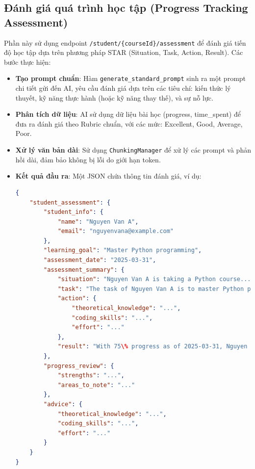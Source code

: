 \subsection{Đánh giá quá trình học tập (Progress Tracking Assessment)}
Phần này sử dụng endpoint \texttt{/student/\{courseId\}/assessment} để đánh giá tiến độ học tập dựa trên phương pháp STAR (Situation, Task, Action, Result). Các bước thực hiện:
\begin{itemize}
    \item \textbf{Tạo prompt chuẩn}: Hàm \texttt{generate\_standard\_prompt} sinh ra một prompt chi tiết gửi đến AI, yêu cầu đánh giá dựa trên các tiêu chí: kiến thức lý thuyết, kỹ năng thực hành (hoặc kỹ năng thay thế), và sự nỗ lực.
    \item \textbf{Phân tích dữ liệu}: AI sử dụng dữ liệu bài học (progress, time\_spent) để đưa ra đánh giá theo Rubric chuẩn, với các mức: Excellent, Good, Average, Poor.
    \item \textbf{Xử lý văn bản dài}: Sử dụng \texttt{ChunkingManager} để xử lý các prompt và phản hồi dài, đảm bảo không bị lỗi do giới hạn token.
    \item \textbf{Kết quả đầu ra}: Một JSON chứa thông tin đánh giá, ví dụ:
    \begin{lstlisting}[language=JSON]
{
    "student_assessment": {
        "student_info": {
            "name": "Nguyen Van A",
            "email": "nguyenvana@example.com"
        },
        "learning_goal": "Master Python programming",
        "assessment_date": "2025-03-31",
        "assessment_summary": {
            "situation": "Nguyen Van A is taking a Python course...",
            "task": "The task of Nguyen Van A is to master Python programming...",
            "action": {
                "theoretical_knowledge": "...",
                "coding_skills": "...",
                "effort": "..."
            },
            "result": "With 75\% progress as of 2025-03-31, Nguyen Van A is on track..."
        },
        "progress_review": {
            "strengths": "...",
            "areas_to_note": "..."
        },
        "advice": {
            "theoretical_knowledge": "...",
            "coding_skills": "...",
            "effort": "..."
        }
    }
}
    \end{lstlisting}
\end{itemize}

